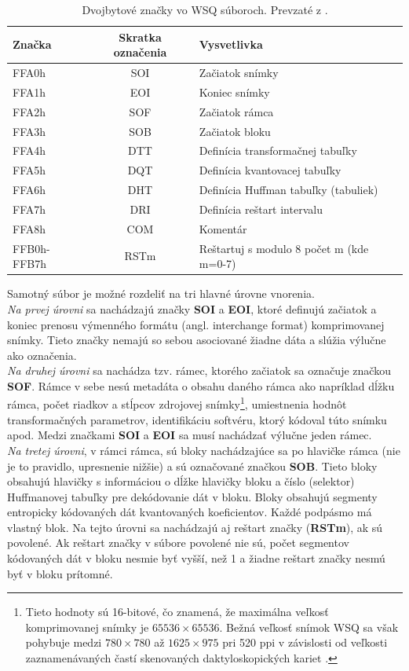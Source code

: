   \begin{table}[ht]
    \centering
    \caption{Dvojbytové značky vo WSQ súboroch. Prevzaté z \cite{WSQSpecification}.}
    \begin{tabular}{ |l c l| }
      \hline
      Značka & Skratka označenia & Vysvetlivka \\
      \hline
      FFA0h       & SOI  & Začiatok snímky \\
      FFA1h       & EOI  & Koniec snímky \\
      FFA2h       & SOF  & Začiatok rámca \\
      FFA3h       & SOB  & Začiatok bloku \\
      FFA4h       & DTT  & Definícia transformačnej tabuľky \\
      FFA5h       & DQT  & Definícia kvantovacej tabuľky \\
      FFA6h       & DHT  & Definícia Huffman tabuľky (tabuliek) \\
      FFA7h       & DRI  & Definícia reštart intervalu \\
      FFA8h       & COM  & Komentár \\
      FFB0h-FFB7h & RSTm & Reštartuj s modulo 8 počet m (kde m=0-7) \\
      \hline
    \end{tabular}
    \label{tab:znacky_WSQ_suboru}
  \end{table}

  Samotný súbor je možné rozdeliť na tri hlavné úrovne vnorenia. \\
  \emph{Na prvej úrovni} sa nachádzajú značky \textbf{SOI} a \textbf{EOI}, ktoré definujú začiatok a koniec prenosu výmenného formátu
  (angl. interchange format) komprimovanej snímky. Tieto značky nemajú so sebou asociované žiadne dáta a slúžia výlučne ako označenia. \\
  \emph{Na druhej úrovni} sa nachádza tzv. rámec, ktorého začiatok sa označuje značkou \textbf{SOF}. Rámce v sebe nesú metadáta o obsahu daného rámca ako
  napríklad dĺžku rámca, počet riadkov a stĺpcov zdrojovej snímky\footnote{Tieto hodnoty sú 16-bitové, čo znamená, že maximálna veľkosť komprimovanej snímky
  je $65536 \times 65536$. Bežná veľkosť snímok WSQ sa však pohybuje medzi $780\times 780$ až $1625 \times 975$ pri 520 ppi v závislosti od veľkosti
  zaznamenávaných častí skenovaných daktyloskopických kariet \cite{hopper_wsq_format}.}, umiestnenia hodnôt transformačných parametrov, identifikáciu softvéru,
  ktorý kódoval túto snímku apod. Medzi značkami \textbf{SOI} a \textbf{EOI} sa musí nachádzať výlučne jeden rámec. \\
  \emph{Na tretej úrovni}, v rámci rámca, sú bloky nachádzajúce sa po hlavičke rámca (nie je to pravidlo, upresnenie nižšie) a sú označované značkou
  \textbf{SOB}. Tieto bloky obsahujú hlavičky s informáciou o dĺžke hlavičky bloku a číslo (selektor) Huffmanovej tabuľky pre dekódovanie dát v bloku.
  Bloky obsahujú segmenty entropicky kódovaných dát kvantovaných koeficientov. Každé podpásmo má vlastný blok. Na tejto úrovni sa nachádzajú aj reštart
  značky (\textbf{RSTm}), ak sú povolené. Ak reštart značky v súbore povolené nie sú, počet segmentov kódovaných dát v bloku nesmie byť vyšší, než 1
  a žiadne reštart značky nesmú byť v bloku prítomné.

